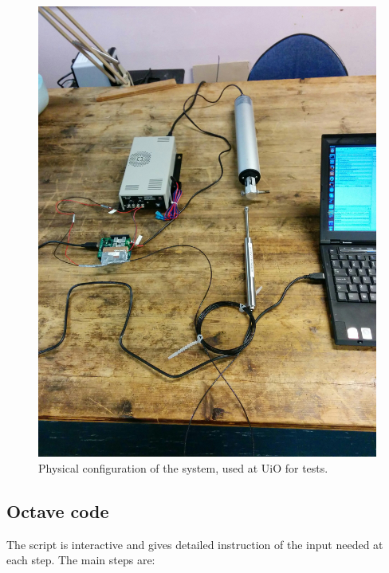 \documentclass[pdftex,a4paper,12pt,onecolumn,fleqn,captions=tableheading]{scrartcl}
\begin{document}
\begin{figure}
\begin{center}
\includegraphics[width=.49\textwidth]{Figures/IMG_20150928_142209}
\caption{Physical configuration of the system, used at UiO for tests.}
\end{center}
\end{figure}

\subsection{Octave code}

The script is interactive and gives detailed instruction of the input needed at each step. The main steps are:
\end{document}
